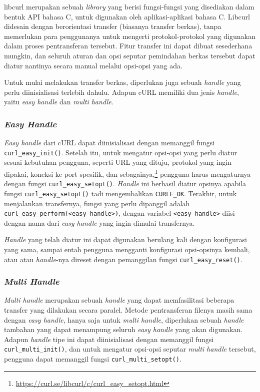libcurl merupakan sebuah \textit{library} yang berisi fungsi-fungsi yang disediakan dalam bentuk API bahasa C, untuk digunakan oleh aplikasi-aplikasi bahasa C. Libcurl didesain dengan berorientasi transfer (biasanya transfer berkas), tanpa memerlukan para penggunanya untuk mengerti protokol-protokol yang digunakan dalam proses pentransferan tersebut. Fitur transfer ini dapat dibuat sesederhana mungkin, dan seluruh aturan dan opsi seputar pemindahan berkas tersebut dapat diatur nantinya secara manual melalui opsi-opsi yang ada.

Untuk mulai melakukan transfer berkas, diperlukan juga sebuah \textit{handle} yang perlu diinisialisasi terlebih dahulu. Adapun cURL memiliki dua jenis \textit{handle}, yaitu \textit{easy handle} dan \textit{multi handle}. 

\subsubsection{\textit{Easy Handle}}
\label{sec:cmodules-libcurl-handleeasy}

\textit{Easy handle} dari cURL dapat diinisialisasi dengan memanggil fungsi \verb|curl_easy_init()|. Setelah itu, untuk mengatur opsi-opsi yang perlu diatur sesuai kebutuhan pengguna, seperti URL yang dituju, protokol yang ingin dipakai, koneksi ke port spesifik, dan sebagainya,\footnote{\href{https://curl.se/libcurl/c/curl\_easy\_setopt.html}{https://curl.se/libcurl/c/curl\_easy\_setopt.html}} pengguna harus mengaturnya dengan fungsi \verb|curl_easy_setopt()|. \textit{Handle} ini berhasil diatur opsinya apabila fungsi \verb|curl_easy_setopt()| tadi mengembalikan \verb|CURLE_OK|. Terakhir, untuk menjalankan transfernya, fungsi yang perlu dipanggil adalah \verb|curl_easy_perform(<easy handle>)|, dengan variabel \verb|<easy handle>| diisi dengan nama dari \textit{easy handle} yang ingin dimulai transfernya.

\textit{Handle} yang telah diatur ini dapat digunakan berulang kali dengan konfigurasi yang sama, sampai entah pengguna mengganti konfigurasi opsi-opsinya kembali, atau atau \textit{handle}-nya direset dengan pemanggilan fungsi \verb|curl_easy_reset()|.

\subsubsection{\textit{Multi Handle}}
\label{sec:cmodules-libcurl-handlemulti}

\textit{Multi handle} merupakan sebuah \textit{handle} yang dapat memfasilitasi beberapa transfer yang dilakukan secara paralel. Metode pentransferan filenya masih sama dengan \textit{easy handle}, hanya saja untuk \textit{multi handle}, diperlukan sebuah \textit{handle} tambahan yang dapat menampung seluruh \textit{easy handle} yang akan digunakan. Adapun \textit{handle} tipe ini dapat diinisialisasi dengan memanggil fungsi \verb|curl_multi_init()|, dan untuk mengatur opsi-opsi seputar \textit{multi handle} tersebut, pengguna dapat memanggil fungsi \verb|curl_multi_setopt()|.

